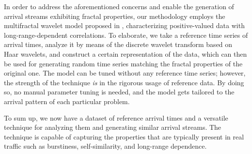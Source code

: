 In order to address the aforementioned concerns and enable the generation of
arrival streams exhibiting fractal properties, our methodology employs the
multifractal wavelet model proposed in \cite{riedi1999}, characterizing
positive-valued data with long-range-dependent correlations. To elaborate, we
take a reference time series of arrival times, analyze it by means of the
discrete wavelet transform based on Haar wavelets, and construct a certain
representation of the data, which can then be used for generating random time
series matching the fractal properties of the original one. The model can be
tuned without any reference time series; however, the strength of the technique
\emph{is} in the rigorous usage of reference data. By doing so, no manual
parameter tuning is needed, and the model gets tailored to the arrival pattern
of each particular problem.

To sum up, we now have a dataset of reference arrival times and a versatile
technique for analyzing them and generating similar arrival streams. The
technique is capable of capturing the properties that are typically present in
real traffic such as burstiness, self-similarity, and long-range dependence.

